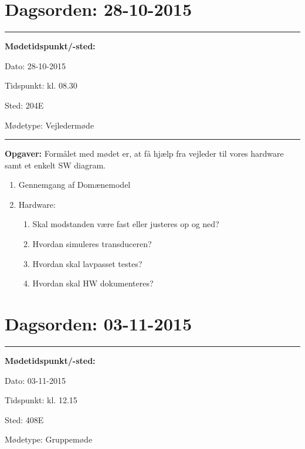 \newpage
\section{Dagsorden: 28-10-2015}
\hrule



\textbf{Mødetidspunkt/-sted:} 

Dato: \tabto{7em} 28-10-2015

Tidspunkt: \tabto{7em} kl. 08.30

Sted: \tabto{7em} 204E

Mødetype: \tabto{7em} Vejledermøde \newline


\hrule
\textbf{Opgaver:} \newline
Formålet med mødet er, at få hjælp fra vejleder til vores hardware samt et enkelt SW diagram.
\begin{enumerate}
\item Gennemgang af Domænemodel
\item Hardware:
\begin{enumerate}
\item Skal modstanden være fast eller justeres op og ned?
\item Hvordan simuleres transduceren?
\item Hvordan skal lavpasset testes?
\item Hvordan skal HW dokumenteres?
\end{enumerate}
\end{enumerate}


\newpage
\section{Dagsorden: 03-11-2015}
\hrule



\textbf{Mødetidspunkt/-sted:} 

Dato: \tabto{7em} 03-11-2015

Tidspunkt: \tabto{7em} kl. 12.15

Sted: \tabto{7em} 408E

Mødetype: \tabto{7em} Gruppemøde \newline


